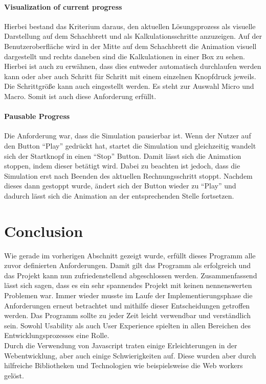 \paragraph{Visualization of current progress}
Hierbei bestand das Kriterium daraus, den aktuellen Lösungsprozess als visuelle Darstellung auf dem Schachbrett und als Kalkulationsschritte anzuzeigen. Auf der Benutzeroberfläche wird in der Mitte auf dem Schachbrett die Animation visuell dargestellt und rechts daneben sind die Kalkulationen in einer Box zu sehen. Hierbei ist auch zu erwähnen, dass dies entweder automatisch durchlaufen werden kann oder aber auch Schritt für Schritt mit einem einzelnen Knopfdruck jeweils. Die Schrittgröße kann auch eingestellt werden. Es steht zur Auswahl Micro und Macro. Somit ist auch diese Anforderung erfüllt.
\paragraph{Pausable Progress}
Die Anforderung war, dass die Simulation pausierbar ist. Wenn der Nutzer auf den Button \enquote{Play} gedrückt hat, startet die Simulation und gleichzeitig wandelt sich der Startknopf in einen \enquote{Stop} Button. Damit lässt sich die Animation stoppen, indem dieser betätigt wird. Dabei zu beachten ist jedoch, dass die Simulation erst nach Beenden des aktuellen Rechnungsschritt stoppt. Nachdem dieses dann gestoppt wurde, ändert sich der Button wieder zu \enquote{Play} und dadurch lässt sich die Animation an der entsprechenden Stelle fortsetzen.
\section{Conclusion}
Wie gerade im vorherigen Abschnitt gezeigt wurde, erfüllt dieses Programm alle zuvor definierten Anforderungen. Damit gilt das Programm als erfolgreich und das Projekt kann nun zufriedenstellend abgeschlossen werden. Zusammenfassend lässt sich sagen, dass es ein sehr spannendes Projekt mit keinen nennenswerten Problemen war. Immer wieder musste im Laufe der Implementierungsphase die Anforderungen erneut betrachtet und mithilfe dieser Entscheidungen getroffen werden. Das Programm sollte zu jeder Zeit leicht verwendbar und verständlich sein. Sowohl Usability als auch User Experience spielten in allen Bereichen des Entwicklungsprozesses eine Rolle. 
\\
Durch die Verwendung von Javascript traten einige Erleichterungen in der Webentwicklung, aber auch einige Schwierigkeiten auf. Diese wurden aber durch hilfreiche Bibliotheken und Technologien wie beispielsweise die Web workers gelöst. 
